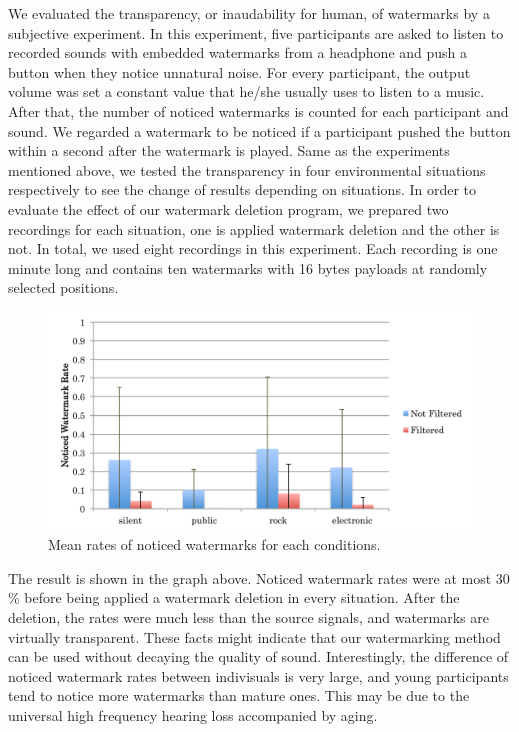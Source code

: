 We evaluated the transparency, or inaudability for human, of watermarks by a subjective experiment.
In this experiment, five participants are asked to listen to recorded sounds with embedded watermarks from a headphone and push a button when they notice unnatural noise.
For every participant, the output volume was set a constant value that he/she usually uses to listen to a music.
After that, the number of noticed watermarks is counted for each participant and sound.
We regarded a watermark to be noticed if a participant pushed the button within a second after the watermark is played.
Same as the experiments mentioned above, we tested the transparency in four environmental situations respectively to see the change of results depending on situations.
In order to evaluate the effect of our watermark deletion program, we prepared two recordings for each situation, one is applied watermark deletion and the other is not.
In total, we used eight recordings in this experiment.
Each recording is one minute long and contains ten watermarks with 16 bytes payloads at randomly selected positions.

\begin{figure}[htbp]
 \begin{center}
  \includegraphics[width=120mm]{evaluation_transparency.pdf}
 \end{center}
 \caption{Mean rates of noticed watermarks for each conditions.}
 \label{fig:eval_tran}
\end{figure}

The result is shown in the graph above.
Noticed watermark rates were at most 30 \% before being applied a watermark deletion in every situation.
After the deletion, the rates were much less than the source signals, and watermarks are virtually transparent.
These facts might indicate that our watermarking method can be used without decaying the quality of sound.
Interestingly, the difference of noticed watermark rates between indivisuals is very large, and young participants tend to notice more watermarks than mature ones.
This may be due to the universal high frequency hearing loss accompanied by aging.